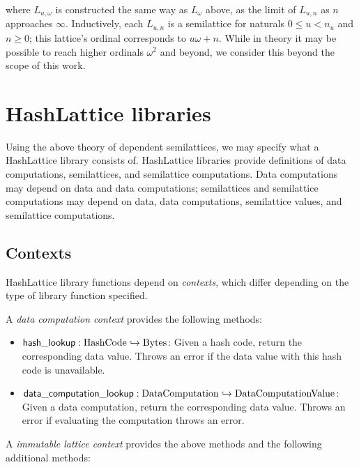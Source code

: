 \documentclass{article}
\begin{document}
      where $L_{u, \omega}$ is constructed the same way as $L_{\omega}$ above, as the limit of $L_{u, n}$ as $n$ approaches $\infty$. Inductively, each $L_{u, n}$ is a semilattice for naturals $0 \leq u < n_u$ and $n \geq 0$; this lattice's ordinal corresponds to $u \omega + n$. While in theory it may be possible to reach higher ordinals $\omega^2$ and beyond, we consider this beyond the scope of this work.

  \section{HashLattice libraries}

    Using the above theory of dependent semilattices, we may specify what a HashLattice library consists of. HashLattice libraries provide definitions of data computations, semilattices, and semilattice computations. Data computations may depend on data and data computations; semilattices and semilattice computations may depend on data, data computations, semilattice values, and semilattice computations.

    \subsection{Contexts}

      HashLattice library functions depend on \emph{contexts}, which differ depending on the type of library function specified.

      A \emph{data computation context} provides the following methods:

      \newcommand{\hashlookup}{\ensuremath{\mathsf{hash\_lookup}}}
      \newcommand{\datacomputationlookup}{\ensuremath{\mathsf{data\_computation\_lookup}}}

      \begin{itemize}
        \item $\hashlookup : \mathrm{HashCode} \partialto \mathrm{Bytes}$: Given a hash code, return the corresponding data value. Throws an error if the data value with this hash code is unavailable.
        \item $\datacomputationlookup : \mathrm{DataComputation} \partialto \mathrm{DataComputationValue}$: Given a data computation, return the corresponding data value. Throws an error if evaluating the computation throws an error.
      \end{itemize}

      A \emph{immutable lattice context} provides the above methods and the following additional methods:
\end{document}
